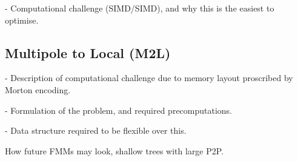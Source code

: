 - Computational challenge (SIMD/SIMD), and why this is the easiest to optimise.

\subsection{Multipole to Local (M2L)}

- Description of computational challenge due to memory layout proscribed by Morton encoding.

- Formulation of the problem, and required precomputations.

- Data structure required to be flexible over this.


How future FMMs may look, shallow trees with large P2P.








% 
% 
% 
% 